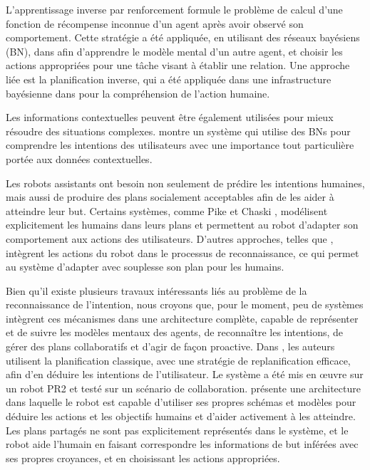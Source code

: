 \documentclass[a4paper,11pt,twoside]{StyleThese}
\begin{document}
L'apprentissage inverse par renforcement \cite{ng2000algorithms} formule le problème de calcul d'une fonction de récompense inconnue d'un agent après avoir observé son comportement. Cette stratégie a été appliquée, en utilisant des réseaux bayésiens (BN), dans \cite{Nagai2015} afin d'apprendre le modèle mental d'un autre agent, et choisir les actions appropriées pour une tâche visant à établir une relation. Une approche liée est la planification inverse, qui a été appliquée dans une infrastructure bayésienne dans \cite{baker2009action} pour la compréhension de l'action humaine.

Les informations contextuelles peuvent être également utilisées pour mieux résoudre des situations complexes. \cite{Liu2014} montre un système qui utilise des BNs pour comprendre les intentions des utilisateurs avec une importance tout particulière portée aux données contextuelles.

Les robots assistants ont besoin non seulement de prédire les intentions humaines, mais aussi de produire des plans socialement acceptables afin de les aider à atteindre leur but. Certains systèmes, comme Pike \cite{karpas2015robust} et Chaski \cite{shah2011improved}, modélisent explicitement les humains dans leurs plans et permettent au robot d'adapter son comportement aux actions des utilisateurs. D'autres approches, telles que \cite{levine2014concurrent}, intègrent les actions du robot dans le processus de reconnaissance, ce qui permet au système d'adapter avec souplesse son plan pour les humains.

Bien qu'il existe plusieurs travaux intéressants liés au problème de la reconnaissance de l'intention, nous croyons que, pour le moment, peu de systèmes intègrent ces mécanismes dans une architecture complète, capable de représenter et de suivre les modèles mentaux des agents, de reconnaître les intentions, de gérer des plans collaboratifs et d'agir de façon proactive. Dans \cite{talamadupula2014coordination}, les auteurs utilisent la planification classique, avec une stratégie de replanification efficace, afin d'en déduire les intentions de l'utilisateur. Le système a été mis en œuvre sur un robot PR2 et testé sur un scénario de collaboration. \cite{breazeal2009embodied} présente une architecture dans laquelle le robot est capable d'utiliser ses propres schémas et modèles pour déduire les actions et les objectifs humains et d'aider activement à les atteindre. Les plans partagés ne sont pas explicitement représentés dans le système, et le robot aide l'humain en faisant correspondre les informations de but inférées avec ses propres croyances, et en choisissant les actions appropriées.
\end{document}
